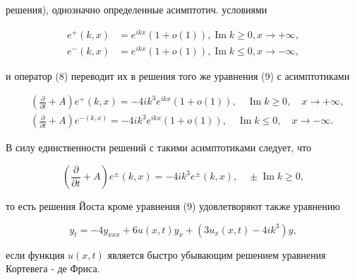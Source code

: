 \documentclass[10pt]{article}
\begin{document}
решения), однозначно определенные асимптотич. условиями



\[

\begin{aligned}

e^{+}(k, x) & =e^{i k x}(1+o(1)), \operatorname{Im} k \geqslant 0, x \rightarrow+\infty, \\

e^{-}(k, x) & =e^{i k x}(1+o(1)), \operatorname{Im} k \leqslant 0, x \rightarrow-\infty,

\end{aligned}

\]



и оператор (8) переводит их в решения того же уравнения (9) с асимптотиками



\[

\begin{aligned}

& \left(\frac{\partial}{\partial t}+A\right) e^{+}(k, x)=-4 i k^{3} e^{i k x}(1+o(1)), \quad \operatorname{Im} k \geqslant 0, \quad x \rightarrow+\infty, \\

& \left(\frac{\partial}{\partial t}+A\right) e^{-(k, x)}=-4 i k^{3} e^{i k x}(1+o(1)), \quad \operatorname{Im} k \leqslant 0, \quad x \rightarrow-\infty .

\end{aligned}

\]



В силу единственности решений с такими асимптотиками следует, что



\[

\left(\frac{\partial}{\partial t}+A\right) e^{ \pm}(k, x)=-4 i k^{3} e^{ \pm}(k, x), \quad \pm \operatorname{Im} k \geqslant 0,

\]



то есть решения Йоста кроме уравнения (9) удовлетворяют также уравнению



\[

y_{t}=-4 y_{x x x}+6 u(x, t) y_{x}+\left(3 u_{x}(x, t)-4 i k^{3}\right) y,

\]



если функция $u(x, t)$ является быстро убывающим решением уравнения Кортевега - де Фриса.
\end{document}
